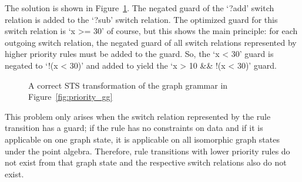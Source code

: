 The solution is shown in Figure~\ref{fig:priority_sts_right}. The negated guard of the `?add' switch relation is added to the `?sub' switch relation. The optimized guard for this switch relation is `x >= 30' of course, but this shows the main principle: for each outgoing switch relation, the negated guard of all switch relations represented by higher priority rules must be added to the guard. So, the `x < 30' guard is negated to `!(x < 30)' and added to yield the `x > 10 \&\& !(x < 30)' guard.

\begin{figure}[ht]
  \begin{center}
    
  \end{center}
  \caption{A correct STS transformation of the graph grammar in Figure~\ref{fig:priority_gg}}
  \label{fig:priority_sts_right}
\end{figure}

This problem only arises when the switch relation represented by the rule transition has a guard; if the rule has no constraints on data and if it is applicable on one graph state, it is applicable on all isomorphic graph states under the point algebra. Therefore, rule transitions with lower priority rules do not exist from that graph state and the respective switch relations also do not exist.
